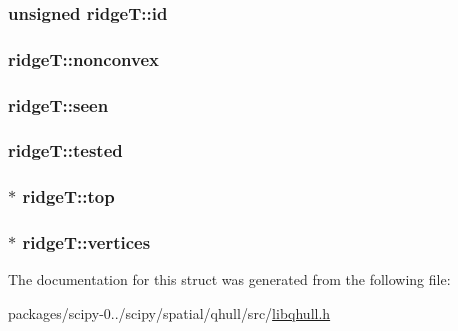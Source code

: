 \subsubsection[{id}]{\setlength{\rightskip}{0pt plus 5cm}unsigned ridge\+T\+::id}\label{structridgeT_a9e79081429d2ace26e6c2394f277d0d5}
\hypertarget{structridgeT_a7f44e0100bccfa83f12702a3aabe7393}{}
\subsubsection[{nonconvex}]{ ridge\+T\+::nonconvex}\label{structridgeT_a7f44e0100bccfa83f12702a3aabe7393}
\hypertarget{structridgeT_a057f291d6707318280f6f82a13141585}{}
\subsubsection[{seen}]{ ridge\+T\+::seen}\label{structridgeT_a057f291d6707318280f6f82a13141585}
\hypertarget{structridgeT_a7a4a3d44636a4e66c43312ffcba096bc}{}
\subsubsection[{tested}]{ ridge\+T\+::tested}\label{structridgeT_a7a4a3d44636a4e66c43312ffcba096bc}
\hypertarget{structridgeT_a3b9ae7ff413008ed39136e9531226333}{}
\subsubsection[{top}]{$\ast$ ridge\+T\+::top}\label{structridgeT_a3b9ae7ff413008ed39136e9531226333}
\hypertarget{structridgeT_a9d3268fe3320b46b5170631f469dd0b4}{}
\subsubsection[{vertices}]{$\ast$ ridge\+T\+::vertices}\label{structridgeT_a9d3268fe3320b46b5170631f469dd0b4}


The documentation for this struct was generated from the following file\+:\begin{DoxyCompactItemize}
\item 
packages/scipy-\/0../scipy/spatial/qhull/src/\hyperlink{libqhull_8h}{libqhull.\+h}\end{DoxyCompactItemize}
